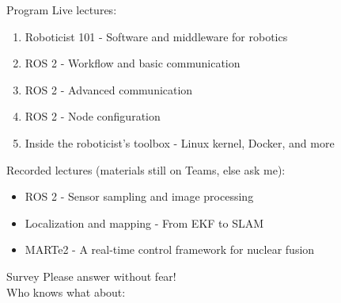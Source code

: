 \begin{frame}{Program}
        Live lectures:
	\begin{enumerate}
		\item Roboticist 101 - Software and middleware for robotics
		\item ROS 2 - Workflow and basic communication
		\item ROS 2 - Advanced communication
		\item ROS 2 - Node configuration
		\item Inside the roboticist's toolbox - Linux kernel, Docker, and more
        \end{enumerate}
        Recorded lectures (materials still on Teams, else ask me):
        \begin{itemize}
		\item ROS 2 - Sensor sampling and image processing
		\item Localization and mapping - From EKF to SLAM
		\item MARTe2 - A real-time control framework for nuclear fusion
	\end{itemize}
\end{frame}

\begin{frame}{Survey}
  Please answer without fear!\\
  \bigskip
  Who knows what about:
  \begin{itemize}
  \end{itemize}
\end{frame}

